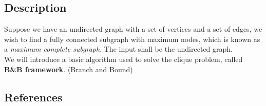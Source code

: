 \documentclass{article}
\begin{document}
\subsection*{Description}
 Suppose we have an undirected graph with a set of vertices and a set of edges, we wish to find a fully connected subgraph with maximum nodes, which is known as a \textit{maximum complete subgraph}. The input shall be the undirected graph. \\
 We will introduce a basic algorithm used to solve the clique problem, called \textbf{B\&B framework}. (Branch and Bound) 
\begin{Algorithm}[name\label{problem22}]
	\BlankLine
\end{Algorithm}
\newpage
\subsection*{References}
\end{document}
